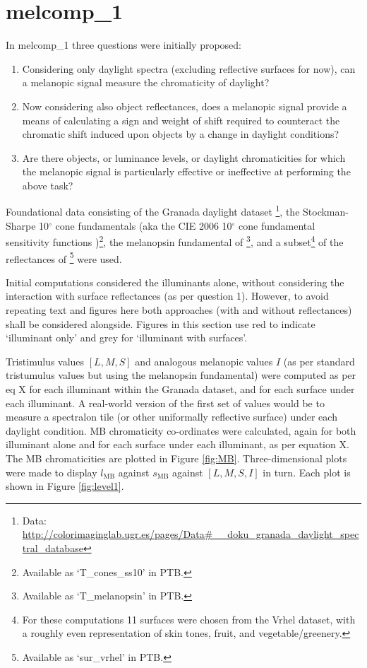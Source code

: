 \section{melcomp\_1}

In melcomp\_1 three questions were initially proposed:
\begin{enumerate}
\item Considering only daylight spectra (excluding reflective surfaces for now), can a melanopic signal measure the chromaticity of daylight? %
\item Now considering also object reflectances, does a melanopic signal provide a means of calculating a sign and weight of shift required to counteract the chromatic shift induced upon objects by a change in daylight conditions?
\item Are there objects, or luminance levels, or daylight chromaticities for which the melanopic signal is particularly effective or ineffective at performing the above task?
\end{enumerate}

Foundational data consisting of 
the Granada daylight dataset 
\citep{hernandez-andres_color_2001}\footnote{Data: \url{http://colorimaginglab.ugr.es/pages/Data\#__doku_granada_daylight_spectral_database}},
the Stockman-Sharpe 10$^{\circ}$ cone fundamentals 
\citep{stockman_spectral_2000,stockman_spectral_1999}
(aka the CIE 2006 10$^{\circ}$ cone fundamental sensitivity functions \cite{cie_cie_2006})\footnote{Available as `T\_cones\_ss10' in \gls{PTB}.},
the melanopsin fundamental of \citet{lucas_measuring_2014}\footnote{Available as `T\_melanopsin' in \gls{PTB}.},
and a subset\footnote{For these computations 11 surfaces were chosen from the Vrhel dataset, with a roughly even representation of skin tones, fruit, and vegetable/greenery.} 
of the reflectances of \citet{vrhel_measurement_1994}\footnote{Available as `sur\_vrhel' in \gls{PTB}.}
were used.

Initial computations considered the illuminants alone, without considering the interaction with surface reflectances (as per question 1). However, to avoid repeating text and figures here both approaches (with and without reflectances) shall be considered alongside. Figures in this section use red to indicate `illuminant only' and grey for `illuminant with surfaces'. 

Tristimulus values $[L,M,S]$ and analogous melanopic values $I$ (as per standard tristumulus values but using the melanopsin fundamental) were computed as per eq X %
for each illuminant within the Granada dataset, and for each surface under each illuminant. A real-world version of the first set of values would be to measure a spectralon tile (or other uniformally reflective surface) under each daylight condition. \gls{MB} chromaticity co-ordinates were calculated, again for both illuminant alone and for each surface under each illuminant, as per equation X. %
The \gls{MB} chromaticities are plotted in Figure \ref{fig:MB}. Three-dimensional plots were made to display $l_{\text{MB}}$ against $s_{\text{MB}}$ against $[L,M,S,I]$ in turn. Each plot is shown in Figure \ref{fig:level1}. 

